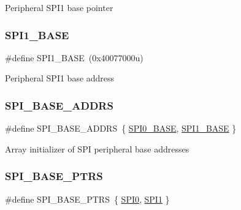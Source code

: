 Peripheral S\+P\+I1 base pointer \mbox{\label{group___s_p_i___peripheral___access___layer_ga50cd8b47929f18b05efbd0f41253bf8d}} 
\subsubsection{\texorpdfstring{SPI1\_BASE}{SPI1\_BASE}}
{\footnotesize\ttfamily \#define S\+P\+I1\+\_\+\+B\+A\+SE~(0x40077000u)}

Peripheral S\+P\+I1 base address \mbox{\label{group___s_p_i___peripheral___access___layer_gab542f6d657e05e21cc2c9e66ae3ceb41}} 
\subsubsection{\texorpdfstring{SPI\_BASE\_ADDRS}{SPI\_BASE\_ADDRS}}
{\footnotesize\ttfamily \#define S\+P\+I\+\_\+\+B\+A\+S\+E\+\_\+\+A\+D\+D\+RS~\{ \mbox{\hyperlink{group___s_p_i___peripheral___access___layer_gadeaa49ab944c7dcae2a868b0450232c8}{S\+P\+I0\+\_\+\+B\+A\+SE}}, \mbox{\hyperlink{group___s_p_i___peripheral___access___layer_ga50cd8b47929f18b05efbd0f41253bf8d}{S\+P\+I1\+\_\+\+B\+A\+SE}} \}}

Array initializer of S\+PI peripheral base addresses \mbox{\label{group___s_p_i___peripheral___access___layer_ga3a16fecfe27c2052ab60e014be3f66f6}} 
\subsubsection{\texorpdfstring{SPI\_BASE\_PTRS}{SPI\_BASE\_PTRS}}
{\footnotesize\ttfamily \#define S\+P\+I\+\_\+\+B\+A\+S\+E\+\_\+\+P\+T\+RS~\{ \mbox{\hyperlink{group___s_p_i___peripheral___access___layer_gaf26e39c91b262cc480085abcc450d3d5}{S\+P\+I0}}, \mbox{\hyperlink{group___s_p_i___peripheral___access___layer_gad483be344a28ac800be8f03654a9612f}{S\+P\+I1}} \}}

